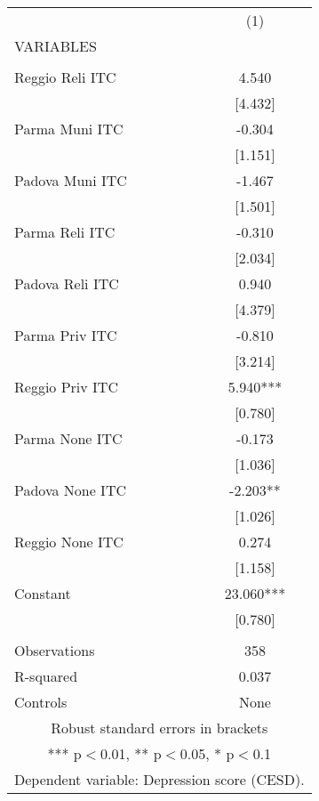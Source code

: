 \begin{tabular}{lc} \hline
 & (1) \\
VARIABLES &  \\ \hline
 &  \\
Reggio Reli ITC & 4.540 \\
 & [4.432] \\
Parma Muni ITC & -0.304 \\
 & [1.151] \\
Padova Muni ITC & -1.467 \\
 & [1.501] \\
Parma Reli ITC & -0.310 \\
 & [2.034] \\
Padova Reli ITC & 0.940 \\
 & [4.379] \\
Parma Priv ITC & -0.810 \\
 & [3.214] \\
Reggio Priv ITC & 5.940*** \\
 & [0.780] \\
Parma None ITC & -0.173 \\
 & [1.036] \\
Padova None ITC & -2.203** \\
 & [1.026] \\
Reggio None ITC & 0.274 \\
 & [1.158] \\
Constant & 23.060*** \\
 & [0.780] \\
 &  \\
Observations & 358 \\
R-squared & 0.037 \\
 Controls & None \\ \hline
\multicolumn{2}{c}{ Robust standard errors in brackets} \\
\multicolumn{2}{c}{ *** p$<$0.01, ** p$<$0.05, * p$<$0.1} \\
\multicolumn{2}{c}{ Dependent variable: Depression score (CESD).} \\
\end{tabular}
